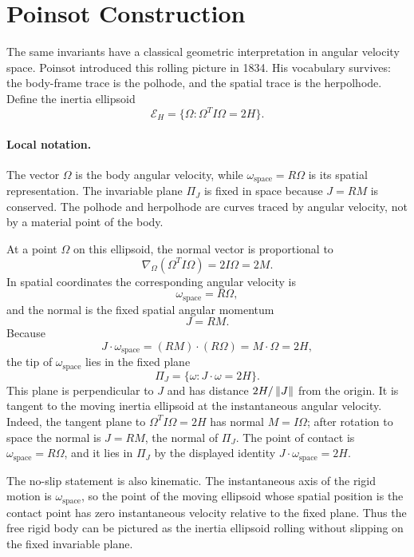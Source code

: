 \section{Poinsot Construction}
\label{sec:poinsot-construction}

The same invariants have a classical geometric interpretation in angular
velocity space. Poinsot introduced this rolling picture in 1834. His vocabulary
survives: the body-frame trace is the polhode, and the spatial trace is the
herpolhode. Define the inertia ellipsoid
\[
  \mathcal E_H=\{\Omega:\Omega^TI\Omega=2H\}.
\]

\paragraph{Local notation.}
The vector \(\Omega\) is the body angular velocity, while
\(\omega_{\mathrm{space}}=R\Omega\) is its spatial representation.  The
invariable plane \(\Pi_J\) is fixed in space because \(J=RM\) is conserved.
The polhode and herpolhode are curves traced by angular velocity, not by a
material point of the body.

At a point \(\Omega\) on this ellipsoid, the normal vector is proportional to
\[
  \nabla_\Omega(\Omega^TI\Omega)=2I\Omega=2M.
\]
In spatial coordinates the corresponding angular velocity is
\[
  \omega_{\mathrm{space}}=R\Omega,
\]
and the normal is the fixed spatial angular momentum
\[
  J=RM.
\]
Because
\[
  J\cdot\omega_{\mathrm{space}}
  =
  (RM)\cdot(R\Omega)
  =
  M\cdot\Omega
  =
  2H,
\]
the tip of \(\omega_{\mathrm{space}}\) lies in the fixed plane
\[
  \boxed{\Pi_J=\{\omega:J\cdot\omega=2H\}.}
\]
This plane is perpendicular to \(J\) and has distance \(2H/\left\lVert J\right\rVert\) from the
origin. It is tangent to the moving inertia ellipsoid at the instantaneous
angular velocity. Indeed, the tangent plane to
\(\Omega^TI\Omega=2H\) has normal \(M=I\Omega\); after rotation to space the
normal is \(J=RM\), the normal of \(\Pi_J\). The point of contact is
\(\omega_{\mathrm{space}}=R\Omega\), and it lies in \(\Pi_J\) by the displayed
identity \(J\cdot\omega_{\mathrm{space}}=2H\).

The no-slip statement is also kinematic. The instantaneous axis of the rigid
motion is \(\omega_{\mathrm{space}}\), so the point of the moving ellipsoid
whose spatial position is the contact point has zero instantaneous velocity
relative to the fixed plane. Thus the free rigid body can be pictured as the
inertia ellipsoid rolling without slipping on the fixed invariable plane.

